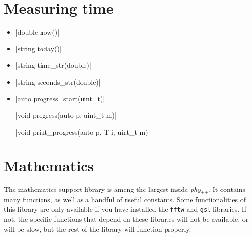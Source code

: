 \documentclass[12pt]{report}
\newcommand{\phypp}{\textit{phy}$_{\text{++}}$\xspace}
\begin{document}
\section{Measuring time \label{SEC:support:time}}

\begin{itemize}

\item \cppinline|double now()| 

\item \cppinline|string today()| 

\item \cppinline|string time_str(double)| 

\item \cppinline|string seconds_str(double)| 

\item \cppinline|auto progress_start(uint_t)| 

\cppinline|void progress(auto p, uint_t m)| 

\cppinline|void print_progress(auto p, T i, uint_t m)| 

\end{itemize}

\section{Mathematics \label{SEC:support:math}}

The mathematics support library is among the largest inside \phypp. It contains many functions, as well as a handful of useful constants. Some functionalities of this library are only available if you have installed the \texttt{fftw} and \texttt{gsl} libraries. If not, the specific functions that depend on these libraries will not be available, or will be slow, but the rest of the library will function properly.
\end{document}
